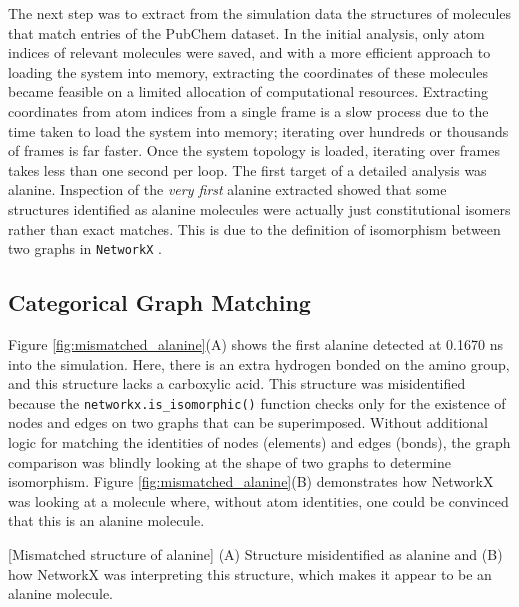 The next step was to extract from the simulation data the structures of molecules that match entries of the PubChem dataset. 
In the initial analysis, only atom indices of relevant molecules were saved, and with a more efficient approach to loading the system into memory, extracting the coordinates of these molecules became feasible on a limited allocation of computational resources.
Extracting coordinates from atom indices from a single frame is a slow process due to the time taken to load the system into memory; iterating over hundreds or thousands of frames is far faster.
Once the system topology is loaded, iterating over frames takes less than one second per loop.
The first target of a detailed analysis was alanine.
Inspection of the \textit{very first} alanine extracted showed that some structures identified as alanine molecules were actually just constitutional isomers rather than exact matches.
This is due to the definition of isomorphism between two graphs in \verb|NetworkX| \cite{networkx}. 

\subsection{Categorical Graph Matching}
\label{subsec:molfind_graphmatcher}

Figure \ref{fig:mismatched_alanine}(A) shows the first alanine detected at 0.1670 ns into the simulation.
Here, there is an extra hydrogen bonded on the amino group, and this structure lacks a carboxylic acid.
This structure was misidentified because the \verb|networkx.is_isomorphic()| function checks only for the existence of nodes and edges on two graphs that can be superimposed.
Without additional logic for matching the identities of nodes (elements) and edges (bonds), the graph comparison was blindly looking at the shape of two graphs to determine isomorphism. 
Figure \ref{fig:mismatched_alanine}(B) demonstrates how NetworkX was looking at a molecule where, without atom identities, one could be convinced that this is an alanine molecule.

\begin{flushleft}
\begin{multiFigure}
[Mismatched structure of alanine]{
(A) Structure misidentified as alanine and
(B) how NetworkX was interpreting this structure, which makes it appear to be an alanine molecule.}
\label{fig:mismatched_alanine}
\end{multiFigure}
\end{flushleft}

